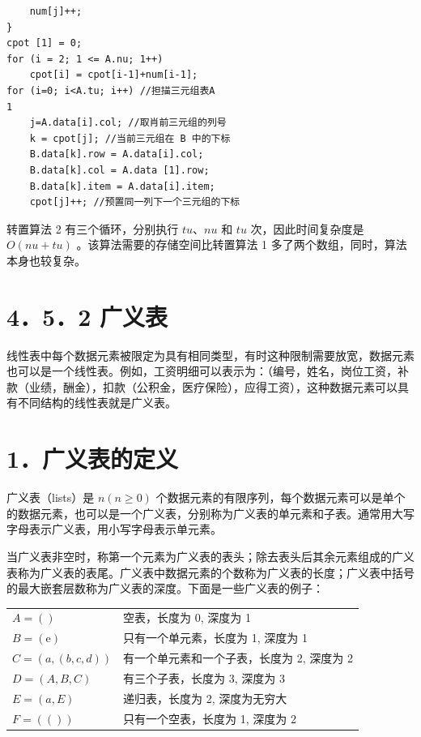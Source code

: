 \documentclass[10pt]{article}
\begin{document}
\begin{verbatim}
    num[j]++;
}
cpot [1] = 0;
for (i = 2; 1 <= A.nu; 1++)
    cpot[i] = cpot[i-1]+num[i-1];
for (i=0; i<A.tu; i++) //担描三元组表A
1
    j=A.data[i].col; //取肖前三元组的列号
    k = cpot[j]; //当前三元组在 B 中的下标
    B.data[k].row = A.data[i].col;
    B.data[k].col = A.data [1].row;
    B.data[k].item = A.data[i].item;
    cpot[j]++; //预置同一列下一个三元组的下标
\end{verbatim}

转置算法 2 有三个循环，分别执行 $t u 、 n u$ 和 $t u$ 次，因此时间复杂度是 $O(n u+t u)$ 。该算法需要的存储空间比转置算法 1 多了两个数组，同时，算法本身也较复杂。

\section*{4．5．2 广义表}
线性表中每个数据元素被限定为具有相同类型，有时这种限制需要放宽，数据元素也可以是一个线性表。例如，工资明细可以表示为：（编号，姓名，岗位工资，补款（业绩，酬金），扣款（公积金，医疗保险），应得工资），这种数据元素可以具有不同结构的线性表就是广义表。

\section*{1．广义表的定义}
广义表（lists）是 $n(n \geqslant 0)$ 个数据元素的有限序列，每个数据元素可以是单个的数据元素，也可以是一个广义表，分别称为广义表的单元素和子表。通常用大写字母表示广义表，用小写字母表示单元素。

当广义表非空时，称第一个元素为广义表的表头；除去表头后其余元素组成的广义表称为广义表的表尾。广义表中数据元素的个数称为广义表的长度；广义表中括号的最大嵌套层数称为广义表的深度。下面是一些广义表的例子：

\begin{center}
\begin{tabular}{ll}
$A=()$ & 空表，长度为 0, 深度为 1 \\
$B=(\mathrm{e})$ & 只有一个单元素，长度为 1, 深度为 1 \\
$C=(a,(b, c, d))$ & 有一个单元素和一个子表，长度为 2, 深度为 2 \\
$D=(A, B, C)$ & 有三个子表，长度为 3, 深度为 3 \\
$E=(a, E)$ & 递归表，长度为 2, 深度为无穷大 \\
$F=(())$ & 只有一个空表，长度为 1, 深度为 2 \\
\end{tabular}
\end{center}
\end{document}
